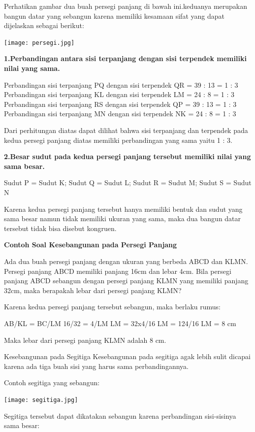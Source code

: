 \documentclass[11pt,fleqn]{book} %
\begin{document}
Perhatikan gambar dua buah persegi panjang di bawah ini.keduanya merupakan bangun datar yang sebangun karena memiliki kesamaan sifat yang dapat dijelaskan sebagai berikut:

\texttt{[image: persegi.jpg]}


\textbf{1.Perbandingan antara sisi terpanjang dengan sisi terpendek memiliki nilai yang sama.}

Perbandingan sisi terpanjang PQ dengan sisi terpendek QR  = 39 : 13  = 1 : 3
Perbandingan sisi terpanjang KL dengan sisi terpendek LM   = 24 : 8    = 1 : 3
Perbandingan sisi terpanjang RS dengan sisi terpendek QP   = 39 : 13  = 1 : 3
Perbandingan sisi terpanjang MN dengan sisi terpendek NK = 24 : 8    = 1 : 3

Dari perhitungan diatas dapat dilihat bahwa sisi terpanjang dan terpendek pada kedua persegi panjang diatas  memiliki perbandingan yang sama yaitu 1 : 3.


\textbf{2.Besar sudut pada kedua persegi panjang tersebut memiliki nilai yang sama besar.}

Sudut P = Sudut K; Sudut Q = Sudut L; Sudut R = Sudut M; Sudut S = Sudut N

Karena kedua persegi panjang tersebut hanya memiliki bentuk dan sudut yang sama besar namun tidak memiliki ukuran yang sama, maka dua bangun datar tersebut tidak bisa disebut kongruen.

\textbf{Contoh Soal Kesebangunan pada Persegi Panjang}

Ada dua buah persegi panjang dengan ukuran yang berbeda ABCD dan KLMN. Persegi panjang ABCD memiliki panjang 16cm dan lebar 4cm. Bila persegi panjang ABCD sebangun dengan persegi panjang KLMN yang memiliki panjang 32cm, maka berapakah lebar dari persegi panjang KLMN?

Karena kedua persegi panjang tersebut sebangun, maka berlaku rumus:

AB/KL = BC/LM
16/32 = 4/LM
   LM = 32x4/16
   LM = 124/16
   LM = 8 cm

Maka lebar dari persegi panjang KLMN adalah 8 cm.


Kesebangunan pada Segitiga
Kesebangunan pada segitiga agak lebih sulit dicapai karena ada tiga buah sisi yang harus sama perbandingannya. 

Contoh segitiga yang sebangun:


\texttt{[image: segitiga.jpg]}


Segitiga tersebut dapat dikatakan sebangun karena perbandingan sisi-sisinya sama besar:
\end{document}
